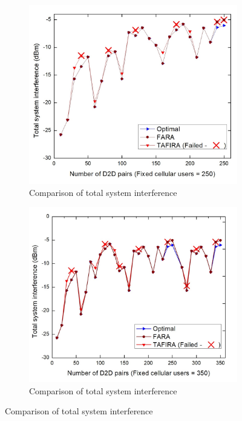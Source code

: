 \documentclass{ieeeaccess}
\begin{document}
\begin{figure}
{
\vspace{-15pt}
\begin{multicols}{2}
\begin{subfigure}{.86\linewidth}
 	\includegraphics[width=\linewidth]{Graph/inter_fara.jpg}\par
	\caption{Comparison of total system interference}
	\label{fig:inter_fair}
	\end{subfigure}
	
	\hspace{12pt}
	\begin{subfigure}{.86\linewidth}
  	\includegraphics[width=\linewidth]{Graph/inter_fara_350.jpg}\par
	\caption{Comparison of total system interference}
	\label{fig:inter_fair_350}
	\end{subfigure}
	\end{multicols}


}
\end{figure}
\end{document}
